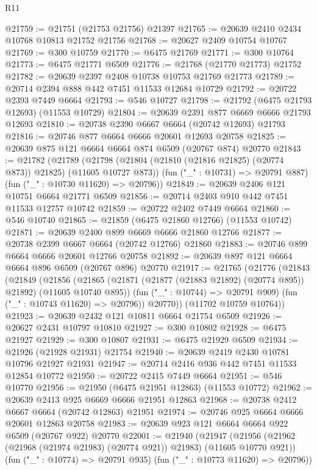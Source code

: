 \begin{lexlean}{R11}
\begin{coremodule}
@21759 := @21751 (@21753 @21756) @21397
@21765 := @20639 @2410 @2434 @10768 @10813 @21752 @21756
@21768 := @20627 @2409 @10754 @10767
@21769 := @300 @10759
@21770 := @6475 @21769
@21771 := @300 @10764
@21773 := @6475 @21771 @6509
@21776 := @21768 (@21770 @21773) @21752
@21782 := @20639 @2397 @2408 @10738 @10753 @21769 @21773
@21789 := @20714 @2394 @888 @442 @7451 @11533 @12684 @10729
@21792 := @20722 @2393 @7449 @6664
@21793 := @546 @10727
@21798 := @21792 (@6475 @21793 @12693) (@11553 @10729)
@21804 := @20639 @2391 @877 @6669 @6666 @21793 @12693
@21810 := @20738 @2390 @6667 @6664 (@20742 @12693) @21793
@21816 := @20746 @877 @6664 @6666 @20601 @12693 @20758
@21825 := @20639 @875 @121 @6664 @6664 @874 @6509 (@20767 @874) @20770
@21843 := @21782
    (@21789
      (@21798 (@21804 (@21810 (@21816 @21825) (@20774 @873)) @21825) (@11605 @10727 @873))
      (fun ("_" : @10731) => @20791 @887)
      (fun ("_" : @10730 @11620) => @20796))
@21849 := @20639 @2406 @121 @10751 @6664 @21771 @6509
@21856 := @20714 @2403 @910 @442 @7451 @11533 @12757 @10742
@21859 := @20722 @2402 @7449 @6664
@21860 := @546 @10740
@21865 := @21859 (@6475 @21860 @12766) (@11553 @10742)
@21871 := @20639 @2400 @899 @6669 @6666 @21860 @12766
@21877 := @20738 @2399 @6667 @6664 (@20742 @12766) @21860
@21883 := @20746 @899 @6664 @6666 @20601 @12766 @20758
@21892 := @20639 @897 @121 @6664 @6664 @896 @6509 (@20767 @896) @20770
@21917 := @21765
    (@21776
      (@21843
        (@21849
          (@21856
            (@21865 (@21871 (@21877 (@21883 @21892) (@20774 @895)) @21892) (@11605 @10740 @895))
            (fun ("_" : @10744) => @20791 @909)
            (fun ("_" : @10743 @11620) => @20796))
          @20770))
      (@11702 @10759 @10764))
@21923 := @20639 @2432 @121 @10811 @6664 @21754 @6509
@21926 := @20627 @2431 @10797 @10810
@21927 := @300 @10802
@21928 := @6475 @21927
@21929 := @300 @10807
@21931 := @6475 @21929 @6509
@21934 := @21926 (@21928 @21931) @21754
@21940 := @20639 @2419 @2430 @10781 @10796 @21927 @21931
@21947 := @20714 @2416 @936 @442 @7451 @11533 @12854 @10772
@21950 := @20722 @2415 @7449 @6664
@21951 := @546 @10770
@21956 := @21950 (@6475 @21951 @12863) (@11553 @10772)
@21962 := @20639 @2413 @925 @6669 @6666 @21951 @12863
@21968 := @20738 @2412 @6667 @6664 (@20742 @12863) @21951
@21974 := @20746 @925 @6664 @6666 @20601 @12863 @20758
@21983 := @20639 @923 @121 @6664 @6664 @922 @6509 (@20767 @922) @20770
@22001 := @21940
    (@21947
      (@21956 (@21962 (@21968 (@21974 @21983) (@20774 @921)) @21983) (@11605 @10770 @921))
      (fun ("_" : @10774) => @20791 @935)
      (fun ("_" : @10773 @11620) => @20796))

\end{coremodule}
\end{lexlean}
